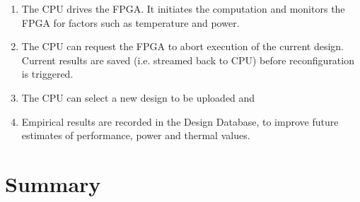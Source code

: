 \begin{enumerate}
\item The CPU drives the FPGA. It initiates the computation and
  monitors the FPGA for factors such as temperature and power.
\item The CPU can request the FPGA to abort execution of the current
  design. Current results are saved (i.e. streamed back to CPU)
  before reconfiguration is triggered.
\item The CPU can select a new design to be uploaded and
\item Empirical results are recorded in the Design Database, to
  improve future estimates of performance, power and thermal values.
\end{enumerate}

\section{Summary}
